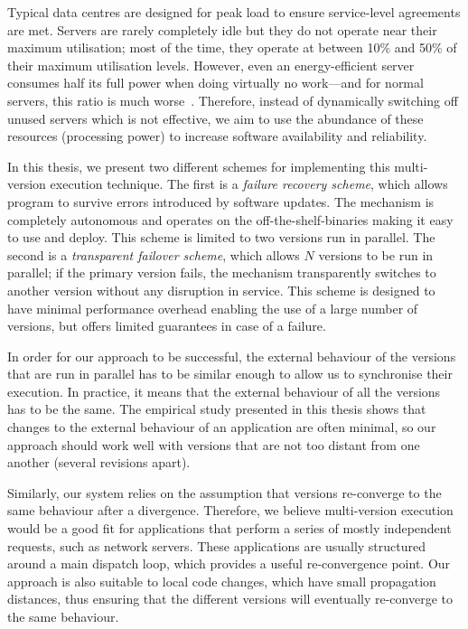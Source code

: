 Typical data centres are designed for peak load to ensure service-level
agreements are met. Servers are rarely completely idle but they do not operate
near their maximum utilisation; most of the time, they operate at between 10\%
and 50\% of their maximum utilisation levels. However, even an energy-efficient
server consumes half its full power when doing virtually no work---and for
normal servers, this ratio is much worse~\cite{barroso2007}.  Therefore,
instead of dynamically switching off unused servers which is not effective, we
aim to use the abundance of these resources (\ie processing power) to increase
software availability and reliability.

In this thesis, we present two different schemes for implementing this
multi-version execution technique. The first is a \emph{failure recovery scheme},
which allows program to survive errors introduced by software updates. The
mechanism is completely autonomous and operates on the off-the-shelf-binaries
making it easy to use and deploy. This scheme is limited to two versions run in
parallel. The second is a \emph{transparent failover scheme}, which allows $N$
versions to be run in parallel; if the primary version fails, the mechanism
transparently switches to another version without any disruption in service.
This scheme is designed to have minimal performance overhead enabling the use
of a large number of versions, but offers limited guarantees in case of a
failure.

In order for our approach to be successful, the external behaviour of the
versions that are run in parallel has to be similar enough to allow us to
synchronise their execution. In practice, it means that the external behaviour
of all the versions has to be the same. The empirical study
presented in this thesis shows that changes to the external behaviour of an
application are often minimal, so our approach should work well with versions
that are not too distant from one another (\ie several revisions apart).

Similarly, our system relies on the assumption that versions re-converge to the
same behaviour after a divergence.  Therefore, we believe multi-version
execution would be a good fit for applications that perform a series of mostly
independent requests, such as network servers. These applications
are usually structured around a main dispatch loop, which provides a useful
re-convergence point. Our approach is also suitable to local code changes,
which have small propagation distances, thus ensuring that the different
versions will eventually re-converge to the same behaviour.

